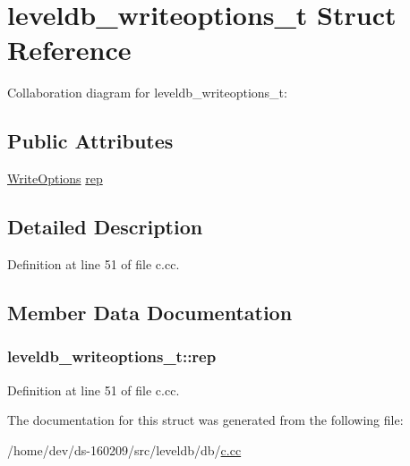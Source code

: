 \hypertarget{structleveldb__writeoptions__t}{}\section{leveldb\+\_\+writeoptions\+\_\+t Struct Reference}
\label{structleveldb__writeoptions__t}


Collaboration diagram for leveldb\+\_\+writeoptions\+\_\+t\+:
\subsection*{Public Attributes}
\begin{DoxyCompactItemize}
\item 
\hyperlink{structleveldb_1_1_write_options}{Write\+Options} \hyperlink{structleveldb__writeoptions__t_ad51ccdc92007bd69dcb075bba4aef788}{rep}
\end{DoxyCompactItemize}


\subsection{Detailed Description}


Definition at line 51 of file c.\+cc.



\subsection{Member Data Documentation}
\hypertarget{structleveldb__writeoptions__t_ad51ccdc92007bd69dcb075bba4aef788}{}
\subsubsection[{rep}]{ leveldb\+\_\+writeoptions\+\_\+t\+::rep}\label{structleveldb__writeoptions__t_ad51ccdc92007bd69dcb075bba4aef788}


Definition at line 51 of file c.\+cc.



The documentation for this struct was generated from the following file\+:\begin{DoxyCompactItemize}
\item 
/home/dev/ds-\/160209/src/leveldb/db/\hyperlink{c_8cc}{c.\+cc}\end{DoxyCompactItemize}
